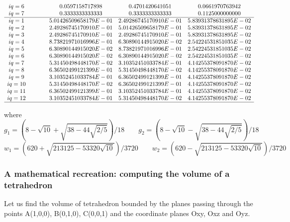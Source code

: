 {\[\begin{array}{ccccccc}
iq=6 &&&&0.0597158717898 &  0.4701420641051  &     0.0661970763942 \\
iq=7 &&&&0.3333333333333 &  0.3333333333333  &     0.1125000000000 \\
\hline
iq=1&&&& 5.01426509658179E-01&  2.49286745170910E-01 &   5.83931378631895E-02 \\ 
iq=2&&&& 2.49286745170910E-01&  5.01426509658179E-01 &   5.83931378631895E-02 \\ 
iq=3&&&& 2.49286745170910E-01&  2.49286745170910E-01 &   5.83931378631895E-02 \\ 
iq=4&&&& 8.73821971016996E-01&  6.30890144915020E-02 &   2.54224531851035E-02 \\ 
iq=5&&&& 6.30890144915020E-02&  8.73821971016996E-01 &   2.54224531851035E-02 \\ 
iq=6&&&& 6.30890144915020E-02&  6.30890144915020E-02 &   2.54224531851035E-02 \\ 
iq=7&&&& 5.31450498448170E-02&  3.10352451033784E-01 &   4.14255378091870E-02 \\ 
iq=8&&&& 6.36502499121399E-01&  5.31450498448170E-02 &   4.14255378091870E-02 \\ 
iq=9&&&& 3.10352451033784E-01&  6.36502499121399E-01 &   4.14255378091870E-02 \\ 
iq=10&&&& 5.31450498448170E-02&  6.36502499121399E-01 &   4.14255378091870E-02 \\ 
iq=11&&&& 6.36502499121399E-01&  3.10352451033784E-01 &   4.14255378091870E-02 \\ 
iq=12&&&& 3.10352451033784E-01&  5.31450498448170E-02 &   4.14255378091870E-02 \\ 
\hline
\end{array}
\]
}

where
\[ 
g_1 = \left(8-\sqrt{10} + \sqrt{38-44\sqrt{2/5}}\right)/18
\qquad
g_2 = \left(8-\sqrt{10} - \sqrt{38-44\sqrt{2/5}}\right)/18
\]
\[
w_1 = \left(620+\sqrt{213125-53320\sqrt{10}}\right)/3720
\qquad
w_2 = \left(620-\sqrt{213125-53320\sqrt{10}}\right)/3720
\]


\subsubsection{A mathematical recreation: computing the volume of a tetrahedron}

Let us find the volume of tetrahedron bounded by the planes passing through the points 
A(1,0,0), B(0,1,0), C(0,0,1) and the coordinate planes Oxy, Oxz and Oyz.

